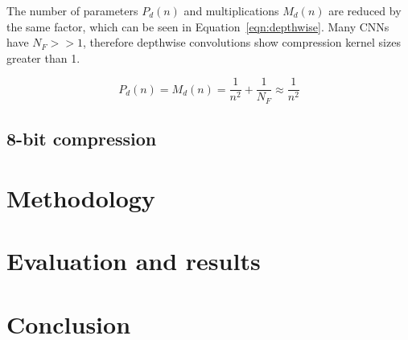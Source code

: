 \documentclass{article}
\begin{document}
	The number of parameters $P_d(n)$ and multiplications $M_d(n)$ are reduced by the same factor, which can be seen in Equation~\ref{eqn:depthwise}. Many CNNs have $N_F >> 1$, therefore depthwise convolutions show compression kernel sizes greater than 1. 

	\begin{equation} \label{eqn:depthwise}
		P_d(n) = M_d(n) = \frac{1}{n^2} + \frac{1}{N_F} \approx \frac{1}{n^2}
	\end{equation}
	
	
	\subsection{8-bit compression}
	
	\section{Methodology}
	
	\section{Evaluation and results}
	
	
	\section{Conclusion}
	
	
	
%	

	
\end{document}
